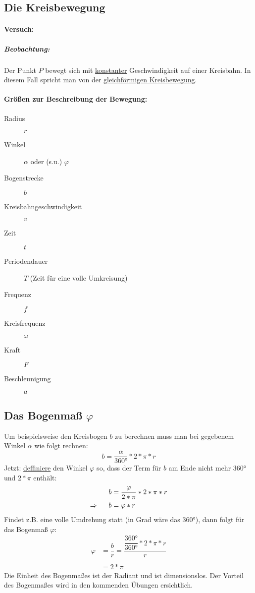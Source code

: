 \documentclass[12pt]{article}
\numberwithin{equation}{subsection}
\begin{document}
	\subsection{Die Kreisbewegung}
	\paragraph{Versuch:}
	\subparagraph{Beobachtung:}
	Der Punkt $ P $ bewegt sich mit \underline{konstanter} Geschwindigkeit auf einer Kreisbahn. In diesem Fall spricht man von der \underline{gleichförmigen Kreisbewegung}.\\
	\paragraph{Größen zur Beschreibung der Bewegung:}
	\begin{description}
		\item[Radius] $ r $
		\item[Winkel] $ \alpha $ oder (s.u.) $ \varphi $
		\item[Bogenstrecke] $ b $
		\item[Kreisbahngeschwindigkeit] $ v $
		\item[Zeit] $ t $
		\item[Periodendauer] $ T $ (Zeit für eine volle Umkreisung)
		\item[Frequenz] $ f $
		\item[Kreisfrequenz] $ \omega $
		\item[Kraft] $ F $
		\item[Beschleunigung] $ a $
	\end{description}
	
	\subsection{Das Bogenmaß $\varphi$}
	Um beispielsweise den Kreisbogen $ b $ zu berechnen muss man bei gegebenem Winkel $ \alpha $ wie folgt rechnen:
	\begin{equation}
		b = \dfrac{\alpha}{360°}*2*\pi*r
	\end{equation}
	Jetzt: \underline{deffiniere} den Winkel $ \varphi $ so, dass der Term für $ b $ am Ende nicht mehr $ 360° $ und $ 2*\pi $ enthält:
	\begin{align}
		b &= \dfrac{\varphi}{2*\pi}*2*\pi*r\\
		\Rightarrow\hspace{0.5cm} b &= \varphi*r
	\end{align}
	Findet z.B. eine volle Umdrehung statt (in Grad wäre das $ 360° $), dann folgt für das Bogenmaß $ \varphi $:
	\begin{align}
		\varphi &= \dfrac{b}{r} = \dfrac{\dfrac{360°}{360°}*2*\pi*r}{r}\\
		\nonumber\\
		&= 2*\pi
	\end{align}
	Die Einheit des Bogenmaßes ist der Radiant und ist dimensionslos. Der Vorteil des Bogenmaßes wird in den kommenden Übungen ersichtlich.
	
\end{document}
